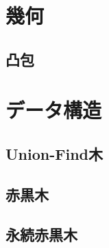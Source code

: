 \documentclass[9pt,twocolumn,a4paper,landscape]{extarticle}
\begin{document}
\section{幾何}

\subsection{凸包}


\section{データ構造}
\subsection{Union-Find木}

\subsection{赤黒木}

\subsection{永続赤黒木}

\end{document}
